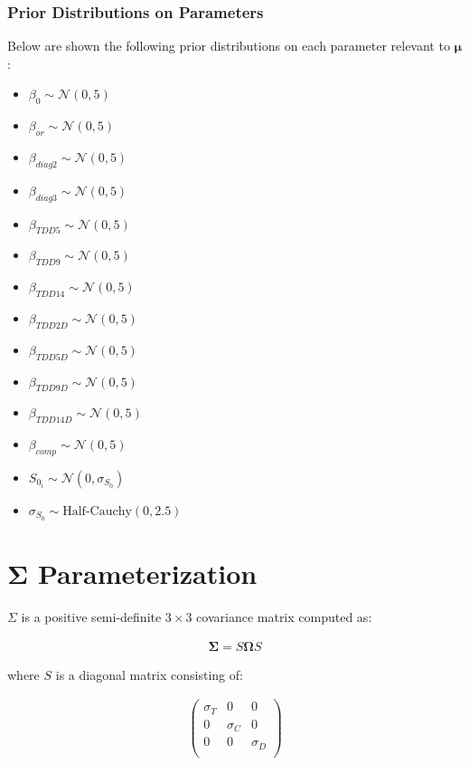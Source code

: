 \subsubsection{Prior Distributions on Parameters}
Below are shown the following prior distributions on each parameter relevant to $\boldsymbol{\mu}$:
\begin{itemize}
    \item $\beta_{0} \sim \mathcal{N}(0,5)$
    \item $\beta_{or} \sim \mathcal{N}(0,5)$
    \item $\beta_{diag2} \sim \mathcal{N}(0,5)$
    \item $\beta_{diag3} \sim \mathcal{N}(0,5)$
    \item $\beta_{TDD5} \sim \mathcal{N}(0,5)$
    \item $\beta_{TDD9} \sim \mathcal{N}(0,5)$
    \item $\beta_{TDD14} \sim \mathcal{N}(0,5)$
    \item $\beta_{TDD2D} \sim \mathcal{N}(0,5)$
    \item $\beta_{TDD5D} \sim \mathcal{N}(0,5)$
    \item $\beta_{TDD9D} \sim \mathcal{N}(0,5)$
    \item $\beta_{TDD14D} \sim \mathcal{N}(0,5)$
    \item $\beta_{comp} \sim \mathcal{N}(0,5)$
    \item $S_{0_i} \sim \mathcal{N}(0,\sigma_{S_0})$
    \item $\sigma_{S_0} \sim \text{Half-Cauchy}(0, 2.5)$
\end{itemize}

\section{\texorpdfstring{$\boldsymbol{\Sigma}$}{Sigma} Parameterization}
$\Sigma$ is a positive semi-definite $3 \times 3$ covariance matrix computed as:

\begin{align}
   \boldsymbol{\Sigma}=S\boldsymbol{\Omega}S
   \label{eqn:Sigma}
\end{align}

where $S$ is a diagonal matrix consisting of: 

\begin{align}
   \begin{pmatrix}
      \sigma_{T} & 0 & 0 \\
      0 & \sigma_{C} & 0 \\
      0 & 0 & \sigma_{D} \\
   \end{pmatrix}
   \label{eqn:S_1}
\end{align}

